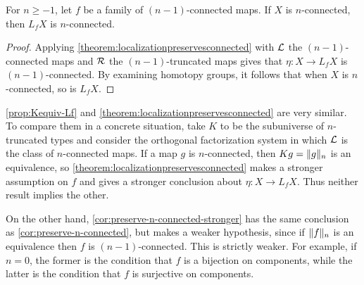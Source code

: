 \begin{cor}\label{cor:preserve-n-connected-stronger}
    For $n \geq -1$, let $f$ be a family of $(n-1)$-connected maps.
    If $X$ is $n$-connected, then $L_f X$ is $n$-connected.
\end{cor}

\begin{proof}
    Applying \cref{theorem:localizationpreservesconnected} with
    $\LLL$ the $(n-1)$-connected maps and $\RRR$ the $(n-1)$-truncated maps
    gives that $\eta : X \to L_f X$ is $(n-1)$-connected.
    By examining homotopy groups, it follows that when $X$ is $n$-connected,
    so is $L_f X$.
\end{proof}

\cref{prop:Kequiv-Lf} and \cref{theorem:localizationpreservesconnected} are very similar.
To compare them in a concrete situation, take $K$ to be the subuniverse of $n$-truncated
types and consider the orthogonal factorization system in which $\LLL$ is the
class of $n$-connected maps.
If a map $g$ is $n$-connected, then $Kg = \trunc{n}{g}$ is an equivalence, so
\cref{theorem:localizationpreservesconnected} makes a stronger assumption on $f$
and gives a stronger conclusion about $\eta : X \to L_f X$.
Thus neither result implies the other.

On the other hand, \cref{cor:preserve-n-connected-stronger} has the same
conclusion as \cref{cor:preserve-n-connected}, but makes a weaker hypothesis,
since if $\trunc{n}{f}$ is an equivalence then $f$ is $(n-1)$-connected.
This is strictly weaker.  For example, if $n = 0$, the former is the
condition that $f$ is a bijection on components, while the latter is
the condition that $f$ is surjective on components.
